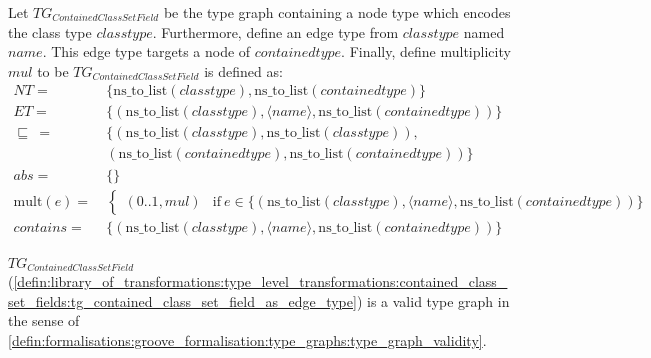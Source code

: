 \begin{defin}
\label{defin:library_of_transformations:type_level_transformations:contained_class_set_fields:tg_contained_class_set_field_as_edge_type}
Let $TG_{ContainedClassSetField}$ be the type graph containing a node type which encodes the class type $classtype$. Furthermore, define an edge type from $classtype$ named $name$. This edge type targets a node of $containedtype$. Finally, define multiplicity $mul$ to be  $TG_{ContainedClassSetField}$ is defined as:
\begin{align*}
NT =\ &\{\mathrm{ns\_\!to\_\!list}(classtype), \mathrm{ns\_\!to\_\!list}(containedtype)\} \\
ET =\ &\{(\mathrm{ns\_\!to\_\!list}(classtype), \langle name \rangle, \mathrm{ns\_\!to\_\!list}(containedtype))\} \\
\!\!\sqsubseteq\ =\ &\{( \mathrm{ns\_\!to\_\!list}(classtype), \mathrm{ns\_\!to\_\!list}(classtype) ),\\&( \mathrm{ns\_\!to\_\!list}(containedtype), \mathrm{ns\_\!to\_\!list}(containedtype) )\} \\
abs =\ &\{\} \\
\mathrm{mult}(e) =\ &\begin{cases}
    (0..1, mul) &\mathrm{if}\ e \in \{(\mathrm{ns\_\!to\_\!list}(classtype), \langle name \rangle, \mathrm{ns\_\!to\_\!list}(containedtype))\}
\end{cases} \\
contains =\ &\{(\mathrm{ns\_\!to\_\!list}(classtype), \langle name \rangle, \mathrm{ns\_\!to\_\!list}(containedtype))\}
\end{align*}
\end{defin}

\begin{thm}
\label{defin:library_of_transformations:type_level_transformations:contained_class_set_fields:tg_contained_class_set_field_as_edge_type_correct}
$TG_{ContainedClassSetField}$ (\cref{defin:library_of_transformations:type_level_transformations:contained_class_set_fields:tg_contained_class_set_field_as_edge_type}) is a valid type graph in the sense of \cref{defin:formalisations:groove_formalisation:type_graphs:type_graph_validity}.
\end{thm}

